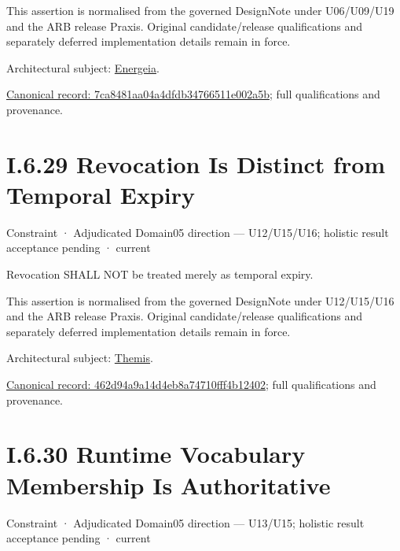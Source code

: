 This assertion is normalised from the governed DesignNote under U06/U09/U19 and the ARB release Praxis. Original candidate/release qualifications and separately deferred implementation details remain in force.



Architectural subject: \hyperref[element:fb3f37a6ac614415ac486a6de9d35994]{Energeia}.


{\footnotesize \href{../../../../../../../../continuum/motivation/constraint/7ca8481aa04a4dfdb34766511e002a5b.md}{Canonical record: 7ca8481aa04a4dfdb34766511e002a5b}; full qualifications and provenance.}\par
\section*{I.6.29 Revocation Is Distinct from Temporal Expiry}
\label{navigation:I.6.29}

\label{element:462d94a9a14d4eb8a74710fff4b12402}
{\small Constraint · Adjudicated Domain05 direction — U12/U15/U16; holistic result acceptance pending · current}\par

Revocation SHALL NOT be treated merely as temporal expiry.



This assertion is normalised from the governed DesignNote under U12/U15/U16 and the ARB release Praxis. Original candidate/release qualifications and separately deferred implementation details remain in force.



Architectural subject: \hyperref[element:899d34ec491948b68aad09e507dea6d1]{Themis}.


{\footnotesize \href{../../../../../../../../continuum/motivation/constraint/462d94a9a14d4eb8a74710fff4b12402.md}{Canonical record: 462d94a9a14d4eb8a74710fff4b12402}; full qualifications and provenance.}\par
\section*{I.6.30 Runtime Vocabulary Membership Is Authoritative}
\label{navigation:I.6.30}

\label{element:872a5f1aa5a44fd4ba68d793c022adf2}
{\small Constraint · Adjudicated Domain05 direction — U13/U15; holistic result acceptance pending · current}\par

